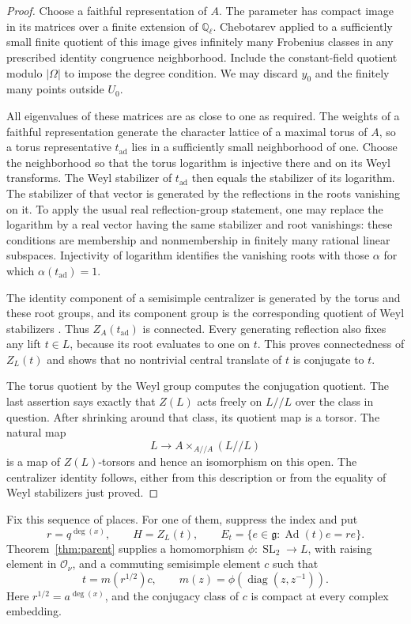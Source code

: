 \documentclass[11pt]{article}
\numberwithin{equation}{section}
\theoremstyle{definition}
\theoremstyle{remark}
\newcommand{\Q}{\mathbb Q}
\newcommand{\g}{\mathfrak g}
\newcommand{\Ad}{\operatorname{Ad}}
\newcommand{\SL}{\operatorname{SL}}
\begin{document}
\begin{proof}
Choose a faithful representation of $A$.  The parameter has compact
image in its matrices over a finite extension of $\Q_\ell$.
Chebotarev applied to a sufficiently small finite quotient of this
image gives infinitely many Frobenius classes in any prescribed
identity congruence neighborhood.  Include the constant-field
quotient modulo $|\Omega|$ to impose the degree condition.  We may
discard $y_0$ and the finitely many points outside $U_0$.

All eigenvalues of these matrices are as close to one as required.
The weights of a faithful representation generate the character
lattice of a maximal torus of $A$, so a torus representative
$t_{\mathrm{ad}}$ lies in a sufficiently small neighborhood of one.
Choose the neighborhood so that the torus logarithm is injective
there and on its Weyl transforms.  The Weyl stabilizer of
$t_{\mathrm{ad}}$ then equals the stabilizer of its logarithm.
The stabilizer of that vector is generated by the reflections in
the roots vanishing on it.  To apply the usual real reflection-group
statement, one may replace the logarithm by a real vector having the
same stabilizer and root vanishings: these conditions are membership
and nonmembership in finitely many rational linear subspaces.
Injectivity of logarithm identifies the vanishing roots with those
$\alpha$ for which $\alpha(t_{\mathrm{ad}})=1$.

The identity component of a semisimple centralizer is generated by
the torus and these root groups, and its component group is the
corresponding quotient of Weyl stabilizers
\cite[Propositions~1.11, 1.12, and~1.14]{global:DigneMichel}.
Thus
$Z_A(t_{\mathrm{ad}})$ is connected.  Every generating reflection
also fixes any lift $t\in L$, because its root evaluates to one on
$t$.  This proves connectedness of $Z_L(t)$ and shows that no
nontrivial central translate of $t$ is conjugate to $t$.

The torus quotient by the Weyl group computes the conjugation
quotient.  The last assertion says exactly that $Z(L)$ acts freely
on $L/\!/L$ over the class in question.  After shrinking around
that class, its quotient map is a torsor.  The natural map
\[
 L\longrightarrow A\mathbin{\times}_{A/\!/A}(L/\!/L)
\]
is a map of $Z(L)$-torsors and hence an isomorphism on this open.
The centralizer identity follows, either from this description or
from the equality of Weyl stabilizers just proved.
\end{proof}

Fix this sequence of places.  For one of them, suppress the index and
put
\[
          r=q^{\deg(x)},\qquad H=Z_L(t),\qquad
          E_t=\{e\in\g:\Ad(t)e=re\}.
\]
Theorem~\ref{thm:parent} supplies a homomorphism
$\phi:\SL_2\to L$, with raising element in $\mathcal O_\nu$,
and a commuting semisimple element $c$ such that
\[
                   t=m(r^{1/2})c,
             \qquad m(z)=\phi(\operatorname{diag}(z,z^{-1})).
\]
Here $r^{1/2}=a^{\deg(x)}$, and the conjugacy class of $c$ is
compact at every complex embedding.
\end{document}

